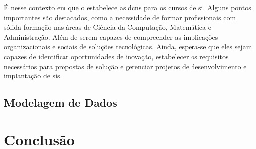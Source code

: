 \documentclass[12pt]{article}
\begin{document}
É nesse contexto em que o \textcite{mec2016dcn} estabelece as \glspl{dcn} para os cursos de \gls{si}.
Alguns pontos importantes são destacados, como a necessidade de formar profissionais com sólida formação nas áreas de Ciência da Computação, Matemática e Administração.
Além de serem capazes de compreender as implicações organizacionais e sociais de soluções tecnológicas.
Ainda, espera-se que eles sejam capazes de identificar oportunidades de inovação, estabelecer os requisitos necessários para propostas de solução e gerenciar projetos de desenvolvimento e implantação de \glspl{si}.



\subsection{Modelagem de Dados}%
\label{sec:modelagem_de_dados}

\section{Conclusão}%
\label{sec:conclusao}

\printbibliography{}
\end{document}
